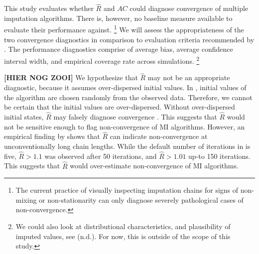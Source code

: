 \documentclass[article]{jss}
\begin{document}
This study evaluates whether $\widehat{R}$ and $AC$ could diagnose convergence of multiple imputation algorithms. There is, however, no baseline measure available to evaluate their performance against.
\footnote{The current practice of visually inspecting imputation chains for signs of non-mixing or non-stationarity can only diagnose severely pathological cases of non-convergence.} 
We will assess the appropriateness of the two convergence diagnostics in comparison to evaluation criteria recommended by \cite[\S~2.5.2]{buur18}. The performance diagnostics comprise of average bias, average confidence interval width, and empirical coverage rate across simulations.%
\footnote{We could also look at distributional characteristics, and plausibility of imputed values, see \cite{vinknd} (n.d.). For now, this is outside of the scope of this study.} %

\textbf{[HIER NOG ZOOI]} We hypothesize that $\widehat{R}$ may not be an appropriate diagnostic, because it assumes over-dispersed initial values. In , initial values of the algorithm are chosen randomly from the observed data. Therefore, we cannot be certain that the initial values are over-dispersed.
Without over-dispersed initial states, $\widehat{R}$ may falsely diagnose convergence \citep{broo98}. %
This suggests that $\widehat{R}$ would not be sensitive enough to flag non-convergence of MI algorithms. However, an empirical finding by \cite{lace07} shows that $\widehat{R}$ can indicate non-convergence at unconventionally long chain lengths. While the default number of iterations in  is five, $\widehat{R} > 1.1$ was observed after 50 iterations, and $\widehat{R} > 1.01$ up-to 150 iterations. This suggests that $\widehat{R}$ would over-estimate non-convergence of MI algorithms. 
\end{document}
